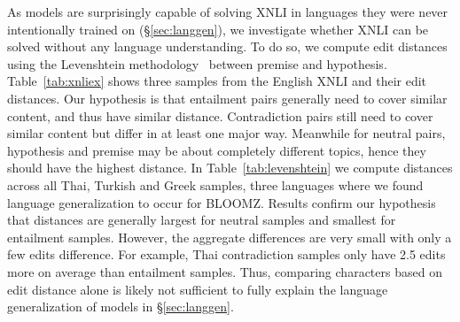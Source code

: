 \documentclass[11pt]{article}
\begin{document}
As models are surprisingly capable of solving XNLI in languages they were never intentionally trained on (\S\ref{sec:langgen}), we investigate whether XNLI can be solved without any language understanding. To do so, we compute edit distances using the Levenshtein methodology~\cite{levenshtein1966binary} between premise and hypothesis. Table~\ref{tab:xnliex} shows three samples from the English XNLI and their edit distances. Our hypothesis is that entailment pairs generally need to cover similar content, and thus have similar distance. Contradiction pairs still need to cover similar content but differ in at least one major way. Meanwhile for neutral pairs, hypothesis and premise may be about completely different topics, hence they should have the highest distance. In Table~\ref{tab:levenshtein} we compute distances across all Thai, Turkish and Greek samples, three languages where we found language generalization to occur for BLOOMZ. Results confirm our hypothesis that distances are generally largest for neutral samples and smallest for entailment samples. However, the aggregate differences are very small with only a few edits difference. For example, Thai contradiction samples only have 2.5 edits more on average than entailment samples. Thus, comparing characters based on edit distance alone is likely not sufficient to fully explain the language generalization of models in \S\ref{sec:langgen}.

\begin{table}[h]
    \small
    \begin{center}
    \caption{Levenshtein distances between hypothesis and premise averaged across samples from different XNLI labels. Each label has 830 samples per language subset.}
    \label{tab:levenshtein}
    \end{center}
\end{table}

\FloatBarrier
\end{document}
